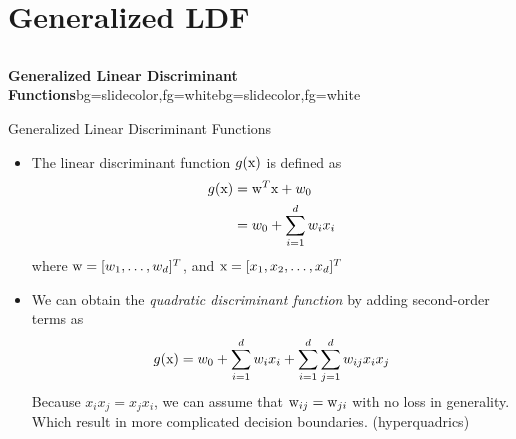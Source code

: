 
\section{Generalized LDF}
\subsection{}

\begin{frame}{}
\begin{variableblock}{\centering \Large \textbf{\vspace{4pt}\newline Generalized Linear Discriminant Functions\vspace{4pt}}}{bg=slidecolor,fg=white}{bg=slidecolor,fg=white}
\end{variableblock}
\end{frame}
\begin{frame}{Generalized Linear Discriminant Functions}
\begin{itemize}
\item The linear discriminant function $g({\rm x})$ is defined as
\begin{align}
g({\rm x}) &= {\rm w}^T{\rm x}+w_0 \\
&= w_0+\sum_{i=1}^d w_ix_i
\end{align}
where ${\rm w}=[w_1,\ldots,w_d]^T$,  and ${\rm x}=[x_1,x_2,\ldots,x_d]^T$
\item We can obtain the \textit{\color{mycolor2}quadratic discriminant function} by adding second-order terms as
\begin{equation}
g({\rm x}) = w_0+\sum_{i=1}^d w_ix_i+\sum_{i=1}^d\sum_{j=1}^dw_{ij}x_ix_j
\end{equation}
Because $x_ix_j=x_jx_i$, we can assume that ${\rm w}_{ij}={\rm w}_{ji}$  with no loss in generality. Which result in more complicated decision boundaries.
({\color{mycolor2}hyperquadrics})
\end{itemize}
\end{frame}

